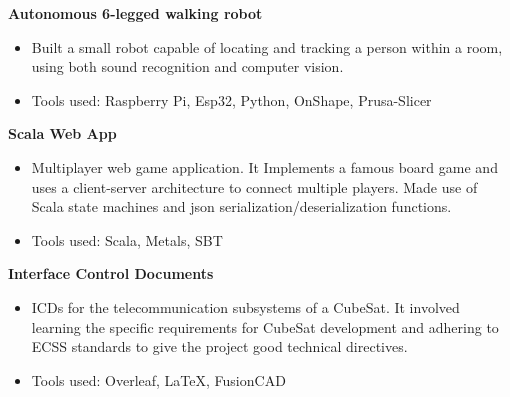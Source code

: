 \documentclass[a4paper, 10pt]{article}
\newenvironment{highlights}{
    \begin{itemize}[
        topsep=0.10 cm,
        parsep=0.10 cm,
        partopsep=0pt,
        itemsep=0pt,
        leftmargin=0.4 cm + 10pt
    ]
}{
    \end{itemize}
} %
\let\hrefWithoutArrow\href
\renewcommand{\href}[2]{\hrefWithoutArrow{#1}{\ifthenelse{\equal{#2}{}}{ }{#2 }\raisebox{.15ex}{\footnotesize \faExternalLink*}}}
\begin{document}
        \textbf{Autonomous 6-legged walking robot}\href{https://github.com/epfl-cs358/2025sp-hexapolo}{}
        \begin{highlights}
            \item Built a small robot capable of locating and tracking a person within a room, using both sound recognition and computer vision.
            \item Tools used: Raspberry Pi, Esp32, Python, OnShape, Prusa-Slicer
        \end{highlights}
        \textbf{Scala Web App}\href{https://github.com/maignal/Scala-Web-App}{}
        \begin{highlights}
            \item Multiplayer web game application. It Implements a famous board game and uses a client-server architecture to connect multiple players. Made use of Scala state machines and json serialization/deserialization functions.
            \item Tools used: Scala, Metals, SBT
        \end{highlights}

        \textbf{Interface Control Documents}\href{https://drive.google.com/drive/folders/1KWNjMkGwcYpTIh6xBs-nddBK195R_ihb?usp=sharing}{}
        \begin{highlights}
            \item ICDs for the telecommunication subsystems of a CubeSat. It involved learning the specific requirements for CubeSat development and adhering to ECSS standards to give the project good technical directives.
            \item Tools used: Overleaf, LaTeX, FusionCAD
        \end{highlights}

\end{document}
